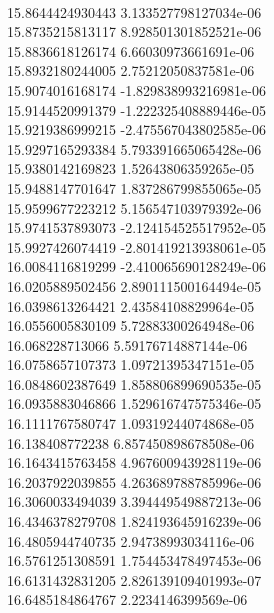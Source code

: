 { \\
15.8644424930443 3.133527798127034e-06
 \\
15.8735215813117 8.928501301852521e-06
 \\
15.8836618126174 6.66030973661691e-06
 \\
15.8932180244005 2.75212050837581e-06
 \\
15.9074016168174 -1.829838993216981e-06
 \\
15.9144520991379 -1.222325408889446e-05
 \\
15.9219386999215 -2.475567043802585e-06
 \\
15.9297165293384 5.793391665065428e-06
 \\
15.9380142169823 1.52643806359265e-05
 \\
15.9488147701647 1.837286799855065e-05
 \\
15.9599677223212 5.156547103979392e-06
 \\
15.9741537893073 -2.124154525517952e-05
 \\
15.9927426074419 -2.801419213938061e-05
 \\
16.0084116819299 -2.410065690128249e-06
 \\
16.0205889502456 2.890111500164494e-05
 \\
16.0398613264421 2.43584108829964e-05
 \\
16.0556005830109 5.72883300264948e-06
 \\
16.068228713066 5.59176714887144e-06
 \\
16.0758657107373 1.09721395347151e-05
 \\
16.0848602387649 1.858806899690535e-05
 \\
16.0935883046866 1.529616747575346e-05
 \\
16.1111767580747 1.09319244074868e-05
 \\
16.138408772238 6.857450898678508e-06
 \\
16.1643415763458 4.967600943928119e-06
 \\
16.2037922039855 4.263689788785996e-06
 \\
16.3060033494039 3.394449549887213e-06
 \\
16.4346378279708 1.824193645916239e-06
 \\
16.4805944740735 2.94738993034116e-06
 \\
16.5761251308591 1.754453478497453e-06
 \\
16.6131432831205 2.826139109401993e-07
 \\
16.6485184864767 2.2234146399569e-06
 \\
}
